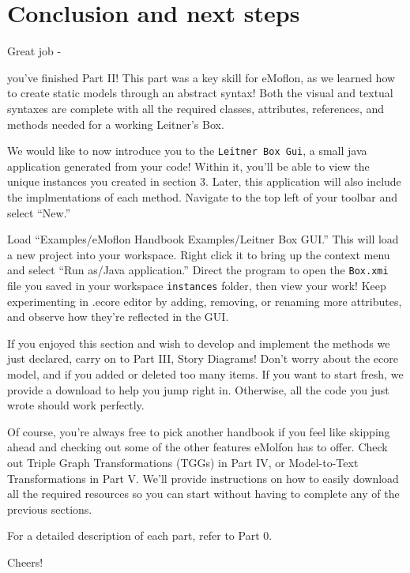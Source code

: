 \genHeader
\section{Conclusion and next steps}

\hypertarget{conclusion}{Great job -} you've finished Part II! This part was a key skill for eMoflon, as we learned how to create static models through an
abstract syntax! Both the visual and textual syntaxes are complete with all the required classes, attributes, references, and methods needed for a working
Leitner's Box.

We would like to now introduce you to the \texttt{Leitner Box Gui}, a small java application generated from your code! Within it, you'll be able to view the
unique instances you created in section 3. Later, this application will also include the implmentations of each method. Navigate to the top left of your toolbar
and select ``New.''

Load ``Examples/eMoflon Handbook Examples/Leitner Box GUI.'' This will load a new project into your workspace. Right click it to bring up the context menu and
select ``Run as/Java application.'' Direct the program to open the \texttt{Box.xmi} file you saved in your workspace \texttt{instances} folder, then view your
work! Keep experimenting in .ecore editor by adding, removing, or renaming more attributes, and observe how they're reflected in the GUI.

If you enjoyed this section and wish to develop and implement the methods we just declared, carry on to Part III, Story Diagrams! Don't worry about the ecore
model, and if you added or deleted too many items. If you want to start fresh, we provide a download to help you jump right in. Otherwise, all the code you just
wrote should work perfectly.

Of course, you're always free to pick another handbook if you feel like skipping ahead and checking out some of the other features eMolfon has to offer. Check
out Triple Graph Transformations (TGGs)  in Part IV, or Model-to-Text Transformations in Part V. We'll provide instructions on how to easily download all the
required resources so you can start without having to complete any of the previous sections.

For a detailed description of each part, refer to Part 0.

Cheers!